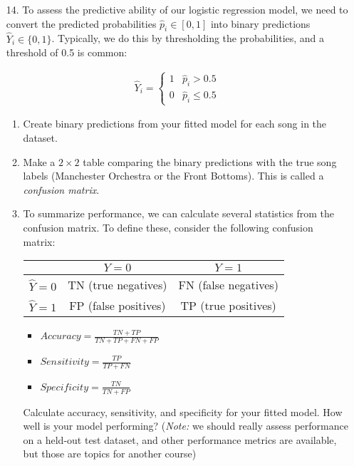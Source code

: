 \documentclass[11pt]{article}
\begin{document}
\begin{enumerate}
\item[14.] To assess the predictive ability of our logistic regression model, we need to convert the predicted probabilities $\widehat{p}_i \in [0,1]$ into binary predictions $\widehat{Y}_i \in \{0, 1\}$. Typically, we do this by thresholding the probabilities, and a threshold of 0.5 is common:

\begin{align*}
\widehat{Y}_i = \begin{cases}
1 & \widehat{p}_i > 0.5\\
0 & \widehat{p}_i \leq 0.5
\end{cases}
\end{align*}

\begin{enumerate}
\item Create binary predictions from your fitted model for each song in the dataset.

\item Make a $2 \times 2$ table comparing the binary predictions with the true song labels (Manchester Orchestra or the Front Bottoms). This is called a \textit{confusion matrix}.

\item To summarize performance, we can calculate several statistics from the confusion matrix. To define these, consider the following confusion matrix:\\

\begin{center}
\begin{tabular}{|c|c|c|}
\hline
& $Y = 0$ & $Y = 1$ \\
\hline
$\widehat{Y} = 0$ & TN (true negatives) & FN (false negatives) \\
$\widehat{Y} = 1$ & FP (false positives) & TP (true positives) \\
\hline
\end{tabular}
\end{center}

\begin{itemize}
\item $Accuracy = \frac{TN + TP}{TN + TP + FN + FP}$
\item $Sensitivity = \frac{TP}{TP + FN}$
\item $Specificity = \frac{TN}{TN + FP}$
\end{itemize}

Calculate accuracy, sensitivity, and specificity for your fitted model. How well is your model performing? (\textit{Note:} we should really assess performance on a held-out test dataset, and other performance metrics are available, but those are topics for another course)
\end{enumerate}
\end{enumerate}
\end{document}
